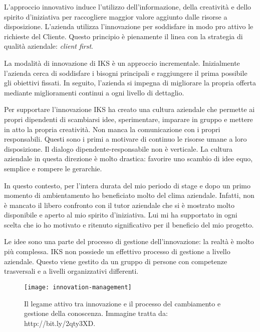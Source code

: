 L'approccio innovativo induce l'utilizzo dell'informazione, della creatività e 
dello spirito d'iniziativa per raccogliere maggior valore aggiunto dalle risorse a 
disposizione. L'azienda utilizza l'innovazione per soddisfare in modo pro attivo 
le richieste del Cliente. Questo principio è pienamente il linea con la strategia 
di qualità aziendale: \textit{client first}.

La modalità di innovazione di IKS è un approccio incrementale. Inizialmente 
l'azienda cerca di soddisfare i bisogni principali e raggiungere il prima 
possibile gli obiettivi fissati. In seguito, l'azienda si impegna di migliorare 
la propria offerta mediante miglioramenti continui a ogni livello di dettaglio. 

Per supportare l'innovazione IKS ha creato una cultura aziendale che permette 
ai propri dipendenti di scambiarsi idee, sperimentare, imparare in gruppo e mettere in 
atto la propria creatività. Non manca la comunicazione con i propri responsabili. 
Questi sono i primi a motivare di continuo le risorse umane a loro disposizione. 
Il dialogo dipendente-responsabile non è verticale. La cultura aziendale in questa 
direzione è molto drastica: favorire uno scambio di idee equo, semplice e rompere 
le gerarchie. 

In questo contesto, per l'intera durata del mio periodo di stage e dopo un 
primo momento di ambientamento ho beneficiato molto del clima aziendale. 
Infatti, non è mancato il libero confronto con il tutor aziendale che si è 
mostrato molto disponibile e aperto al mio spirito d'iniziativa. Lui mi ha 
supportato in ogni scelta che io ho motivato e ritenuto significativo per il 
beneficio del mio progetto. 

Le idee sono una parte del processo di gestione dell'innovazione: la realtà è 
molto più complessa. IKS non possiede un effettivo processo di gestione a 
livello aziendale. Questo viene gestito da un gruppo di persone con competenze 
trasversali e a livelli organizzativi differenti. 

\begin{figure}[htbp]
   \begin{center}
	\texttt{[image: innovation-management]}
	\caption{Il legame attivo tra innovazione e il processo del cambiamento 
	e gestione della conoscenza. Immagine tratta da: http://bit.ly/2qty3XD.}
   \end{center}
\end{figure}


\newpage 